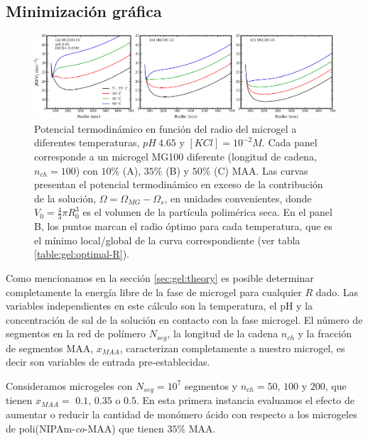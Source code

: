 \subsection{Minimizaci\'on gr\'afica}\label{sec:gel:minimi}

\begin{figure}[!htb]
\centering
\includegraphics[width=1.\linewidth]{Figures/graph-gel/graph-min.pdf}
\caption{Potencial termodin\'amico en funci\'on del radio del microgel a diferentes temperaturas, $pH~4.65$ y $[KCl]=10^{-2}M$.
	Cada panel corresponde a un microgel MG100 diferente (longitud de cadena, $n_{ch}=100$) con $10\%$ (A), $35\%$ (B) y $50\%$ (C) MAA.
	Las curvas presentan el potencial termodin\'amico en exceso de la contribuci\'on de la soluci\'on, $\Omega=\Omega_{MG}-\Omega_s$, en unidades convenientes, donde $V_0=\frac{4}{3}\pi R_0^3$ es el volumen de la part\'icula polim\'erica seca.
	En el panel B, los puntos  marcan el radio \'optimo para cada temperatura, que es el m\'inimo local/global de la curva correspondiente (ver tabla \ref{table:gel:optimal-R}).}
\label{fig:gel:graph-min}
\end{figure}

Como mencionamos en la secci\'on \ref{sec:gel:theory} es posible determinar completamente la energ\'ia libre de la fase de microgel para cualquier $R$ dado.
Las variables independientes en este c\'alculo son la temperatura, el pH y la concentraci\'on de sal de la soluci\'on en contacto con la fase microgel.
El n\'umero de segmentos en la red de pol\'imero $N_{seg}$, la longitud de la cadena $n_{ch}$ y la fracci\'on de segmentos MAA, $x_{MAA}$, caracterizan completamente a nuestro microgel, es decir son variables de entrada pre-establecidas.


Consideramos microgeles con $N_{seg}=10^7$ segmentos y $n_{ch}=50$, $100$ y $200$, que tienen $x_{MAA}=$ $0.1$, $0.35$ o $0.5$.
En esta primera instancia evaluamos el efecto de aumentar o reducir la cantidad de mon\'omero \'acido con respecto a los microgeles de poli(NIPAm-\emph{co}-MAA) que tienen $35\%$ MAA.

